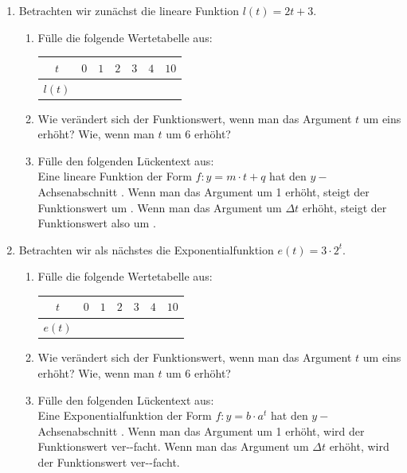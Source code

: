 \documentclass[11pt,oneside]{article}
\begin{document}
	\begin{aufgabe}
		\begin{enumerate}
			\item Betrachten wir zunächst die lineare Funktion $l(t)=2t+3$.
			\begin{enumerate}[label=\alph*)]
				\item Fülle die folgende Wertetabelle aus:
				\begingroup
				\renewcommand{\arraystretch}{1.5}
				\begin{table}[H]
					\centering
					\begin{tabular}{c|p{10mm}|p{10mm}|p{10mm}|p{10mm}|p{10mm}|p{10mm}}
						$t$ & $0$ & $1$ & $2$ & $3$ & $4$ & $10$\\\hline
						$l(t)$ & & & & &
					\end{tabular}
				\end{table}
				\endgroup
				\item Wie verändert sich der Funktionswert, wenn man das Argument $t$ um eins erhöht? Wie, wenn man $t$ um 6 erhöht?
				\item Fülle den folgenden Lückentext aus:\\ Eine lineare Funktion der Form $f:y=m\cdot t+q$ hat den $y-$Achsenabschnitt . Wenn man das Argument um 1 erhöht, steigt der Funktionswert um . Wenn man das Argument um $\Delta t$ erhöht, steigt der Funktionswert also um \gap{2}.
			\end{enumerate}
		\end{enumerate}
		\newpage
		\begin{enumerate}
			\setcounter{enumi}{1}
			\item Betrachten wir als nächstes die Exponentialfunktion $e(t)=3\cdot 2^t$.
			\begin{enumerate}[label=\alph*)]
				\item Fülle die folgende Wertetabelle aus:
				\begingroup
				\renewcommand{\arraystretch}{1.5}
				\begin{table}[H]
					\centering
					\begin{tabular}{c|p{10mm}|p{10mm}|p{10mm}|p{10mm}|p{10mm}|p{10mm}}
						$t$ & $0$ & $1$ & $2$ & $3$ & $4$ & $10$\\\hline
						$e(t)$ & & & & &
					\end{tabular}
				\end{table}
				\endgroup
				\item Wie verändert sich der Funktionswert, wenn man das Argument $t$ um eins erhöht? Wie, wenn man $t$ um 6 erhöht?
				\item Fülle den folgenden Lückentext aus:\\ Eine Exponentialfunktion der Form $f:y=b\cdot a^t$ hat den $y-$Achsenabschnitt . Wenn man das Argument um 1 erhöht, wird der Funktionswert ver--facht. Wenn man das Argument um $\Delta t$ erhöht, wird der Funktionswert ver--facht.
			\end{enumerate}
		\end{enumerate}
	\end{aufgabe}
\end{document}

